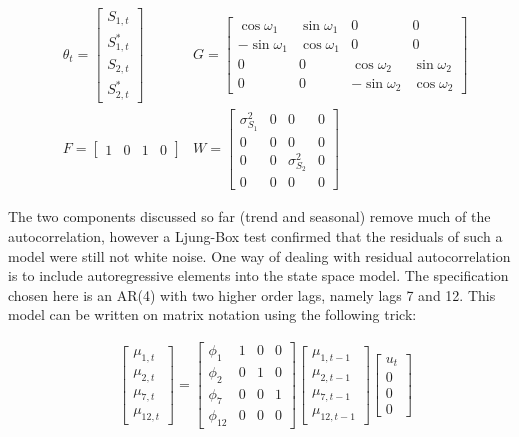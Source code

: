 \documentclass[12pt, a4paper]{article}
\begin{document}
\begin{align*}
   & \theta_{t} = \begin{bmatrix}
    S_{1, t} \\ S_{1, t}^{*} \\ S_{2, t} \\ S_{2, t}^{*}
  \end{bmatrix}
   & G = \begin{bmatrix}
    \cos \omega_{1} & \sin \omega_{1} & 0 & 0 \\ 
    -\sin \omega_{1} & \cos \omega_{1} & 0 & 0 \\
    0 & 0 & \cos \omega_{2} & \sin \omega_{2} \\
    0 & 0 & -\sin \omega_{2} & \cos \omega_{2}
  \end{bmatrix}
   \\
    & F = \begin{bmatrix} 1 & 0 & 1 & 0 \end{bmatrix}   
   & W = \begin{bmatrix}
     \sigma_{S_{1}}^{2} & 0 & 0 & 0 \\
     0 & 0 & 0 & 0 \\
     0 & 0 & \sigma_{S_{2}}^{2} & 0  \\
     0 & 0 & 0 & 0
   \end{bmatrix}
\end{align*}

The two components discussed so far (trend and seasonal) remove much of
the autocorrelation, however a Ljung-Box test confirmed that the
residuals of such a model were still not white noise. One
way of dealing with residual autocorrelation is to include
autoregressive elements into the state space model. The specification chosen here is
an AR(4) with two higher order lags, namely lags 7 and 12. This model can be written on matrix notation using the following trick:

\begin{align*}
&\begin{bmatrix}
 \mu_{1,t} \\ \mu_{2,t} \\ \mu_{7,t} \\ \mu_{12,t} 
\end{bmatrix} =  \begin{bmatrix} 
\phi_{1} & 1 & 0 & 0 \\ 
\phi_{2} & 0 & 1 & 0 \\
\phi_{7} & 0 & 0 & 1 \\
\phi_{12} & 0 & 0 & 0 
\end{bmatrix} \begin{bmatrix} 
\mu_{1,t-1} \\ \mu_{2,t-1} \\ \mu_{7,t-1} \\ \mu_{12,t-1} 
\end{bmatrix} \begin{bmatrix}
u_{t} \\ 0 \\ 0 \\ 0 
\end{bmatrix}
\end{align*}
\end{document}
